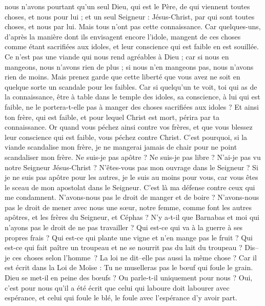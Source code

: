 \begin{multicols}{2}
nous n'avons pourtant qu'un seul Dieu, qui est le Père, de qui viennent toutes choses, et nous pour lui ; et un seul Seigneur : Jésus-Christ, par qui sont toutes choses, et nous par lui.
Mais tous n'ont pas cette connaissance. Car quelques-uns, d'après la manière dont ils envisagent encore l'idole, mangent de ces choses comme étant sacrifiées aux idoles, et leur conscience qui est faible en est souillée.
Ce n'est pas une viande qui nous rend agréables à Dieu ; car si nous en mangeons, nous n'avons rien de plus ; si nous n'en mangeons pas, nous n'avons rien de moins.
Mais prenez garde que cette liberté que vous avez ne soit en quelque sorte un scandale pour les faibles.
Car si quelqu'un te voit, toi qui as de la connaissance, être à table dans le temple des idoles, sa conscience, à lui qui est faible, ne le portera-t-elle pas à manger des choses sacrifiées aux idoles ?
Et ainsi ton frère, qui est faible, et pour lequel Christ est mort, périra par ta connaissance.
Or quand vous péchez ainsi contre vos frères, et que vous blessez leur conscience qui est faible, vous péchez contre Christ.
C'est pourquoi, si la viande scandalise mon frère, je ne mangerai jamais de chair pour ne point scandaliser mon frère.
\VerseOne{}Ne suis-je pas apôtre ? Ne suis-je pas libre ? N'ai-je pas vu notre Seigneur Jésus-Christ ? N'êtes-vous pas mon ouvrage dans le Seigneur ?
Si je ne suis pas apôtre pour les autres, je le suis au moins pour vous, car vous êtes le sceau de mon apostolat dans le Seigneur.
C'est là ma défense contre ceux qui me condamnent.
N'avons-nous pas le droit de manger et de boire ?
N'avons-nous pas le droit de mener avec nous une sœur, notre femme, comme font les autres apôtres, et les frères du Seigneur, et Céphas ?
N'y a-t-il que Barnabas et moi qui n'ayons pas le droit de ne pas travailler ?
Qui est-ce qui va à la guerre à ses propres frais ? Qui est-ce qui plante une vigne et n'en mange pas le fruit ? Qui est-ce qui fait paître un troupeau et ne se nourrit pas du lait du troupeau ?
Dis–je ces choses selon l'homme ? La loi ne dit–elle pas aussi la même chose ?
Car il est écrit dans la Loi de Moïse : Tu ne muselleras pas le bœuf qui foule le grain. Dieu se met-il en peine des bœufs ?
Ou parle-t-il uniquement pour nous ? Oui, c'est pour nous qu'il a été écrit que celui qui laboure doit labourer avec espérance, et celui qui foule le blé, le foule avec l'espérance d'y avoir part.

\end{multicols}
